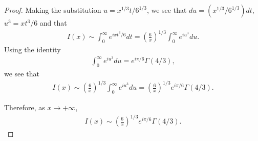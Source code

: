 \documentclass[12pt]{article}
\theoremstyle{definition}
\begin{document}
\begin{proof}
  Making the substitution $u = x^{1/3}t/6^{1/3}$, we see that $du = (x^{1/3}/6^{1/3}) dt$, $u^3 = x t^3 / 6$ and that
  \begin{align*}
    I(x) \sim \int_0^\infty e^{ix t^3/6} dt = \left(\frac{6}{x}\right)^{1/3}\int_0^\infty e^{iu^3} du.
  \end{align*}
  Using the identity
  \begin{align*}
    \int_0^\infty e^{iu^3} du = e^{i \pi/6}\Gamma(4/3),
  \end{align*}
  we see that
  \begin{align*}
    I(x) \sim \left(\frac{6}{x}\right)^{1/3}\int_0^\infty e^{iu^3} du = \left(\frac{6}{x}\right)^{1/3}e^{i \pi/6}\Gamma(4/3).
  \end{align*}

  Therefore, as $x \to +\infty$,
  \begin{align*}
    I(x) \sim \left(\frac{6}{x}\right)^{1/3}e^{i \pi/6}\Gamma(4/3).
  \end{align*}
\end{proof}
\end{document}
